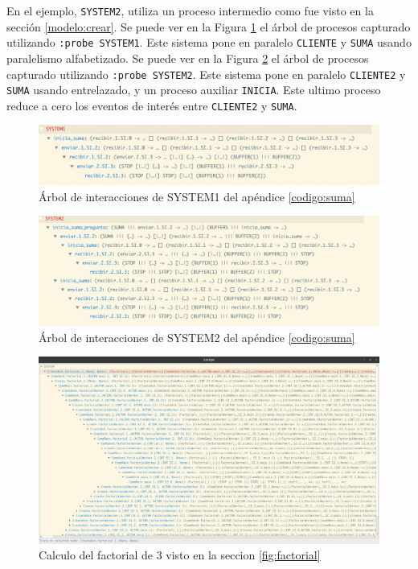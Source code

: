 En el ejemplo, \verb=SYSTEM2=, utiliza un proceso intermedio como fue visto en la sección \ref{modelo:crear}. Se puede ver en la Figura \ref{modelo:suma:system1} el árbol de procesos capturado utilizando \verb=:probe SYSTEM1=. Este sistema pone en paralelo \verb-CLIENTE- y \verb-SUMA- usando paralelismo alfabetizado. Se puede ver en la Figura \ref{modelo:suma:system2} el árbol de procesos capturado utilizando \verb=:probe SYSTEM2=. Este sistema pone en paralelo \verb-CLIENTE2- y \verb-SUMA- usando entrelazado, y un proceso auxiliar \verb-INICIA-. Este ultimo proceso reduce a cero los eventos de interés entre \verb-CLIENTE2- y \verb-SUMA-.

\begin{figure}[H]
\begin{center}
\includegraphics[width=15 cm]{img/sumasystem1.png}
\caption{Árbol de interacciones de SYSTEM1 del apéndice \ref{codigo:suma}}
\label{modelo:suma:system1}
\end{center}
\end{figure}

\begin{figure}[H]
\begin{center}
\includegraphics[width=15 cm]{img/sumasystem2.png}
\caption{Árbol de interacciones de SYSTEM2 del apéndice \ref{codigo:suma}}
\label{modelo:suma:system2}
\end{center}
\end{figure}

\begin{figure}
\begin{center}
\includegraphics[width=24 cm, angle=90]{img/fact.png}
\caption{Calculo del factorial de 3 visto en la seccion \ref{fig:factorial}}\label{modelo:grafo}
\end{center}
\end{figure}

